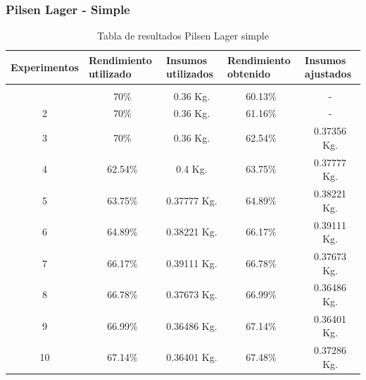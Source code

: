         \subsubsection{Pilsen Lager - Simple}
        
        \begin{longtable}{|p{2.7cm}|p{2.7cm}|p{2.7cm}|p{2.7cm}|p{2.7cm}|}
        \hline
        Experimentos & Rendimiento utilizado & Insumos utilizados & Rendimiento obtenido & Insumos ajustados\\
        \endfirsthead
        
        \endhead
 
        \endfoot
        
        \hline
        \caption{Tabla de resultados Pilsen Lager simple\label{tab:ResultadosPilsenSimple}}\\
        \endlastfoot
        \hline
             \multicolumn{1}{|c|}{1} & \multicolumn{1}{c|}{70\%} & \multicolumn{1}{c|}{0.36 Kg.} &\multicolumn{1}{c|}{60.13\%} &\multicolumn{1}{c|}{-} \\
             \hline
             \multicolumn{1}{|c|}{2} & \multicolumn{1}{c|}{70\%}  & \multicolumn{1}{c|}{0.36 Kg.} &\multicolumn{1}{c|}{61.16\%} &\multicolumn{1}{c|}{-} \\
             \hline
             \multicolumn{1}{|c|}{3} & \multicolumn{1}{c|}{70\%} & \multicolumn{1}{c|}{0.36 Kg.} &\multicolumn{1}{c|}{62.54\%} &\multicolumn{1}{c|}{0.37356 Kg.} \\
             \hline
             \multicolumn{1}{|c|}{4} & \multicolumn{1}{c|}{62.54\%}  & \multicolumn{1}{c|}{0.4 Kg.} &\multicolumn{1}{c|}{63.75\%} &\multicolumn{1}{c|}{0.37777 Kg.} \\
             \hline
             \multicolumn{1}{|c|}{5} & \multicolumn{1}{c|}{63.75\%}  & \multicolumn{1}{c|}{0.37777 Kg.} &\multicolumn{1}{c|}{64.89\%} &\multicolumn{1}{c|}{0.38221 Kg.} \\
             \hline
             \multicolumn{1}{|c|}{6} & \multicolumn{1}{c|}{64.89\%}  & \multicolumn{1}{c|}{0.38221 Kg.} &\multicolumn{1}{c|}{66.17\%} &\multicolumn{1}{c|}{0.39111 Kg.} \\
             \hline
             \multicolumn{1}{|c|}{7} & \multicolumn{1}{c|}{66.17\%}  & \multicolumn{1}{c|}{0.39111 Kg.} &\multicolumn{1}{c|}{66.78\%} &\multicolumn{1}{c|}{0.37673 Kg.} \\
             \hline
             \multicolumn{1}{|c|}{8} & \multicolumn{1}{c|}{66.78\%}  & \multicolumn{1}{c|}{0.37673 Kg.} &\multicolumn{1}{c|}{66.99\%} &\multicolumn{1}{c|}{0.36486 Kg.} \\
             \hline
             \multicolumn{1}{|c|}{9} & \multicolumn{1}{c|}{66.99\%}  & \multicolumn{1}{c|}{0.36486 Kg.} &\multicolumn{1}{c|}{67.14\%} &\multicolumn{1}{c|}{0.36401 Kg.} \\
             \hline
             \multicolumn{1}{|c|}{10} & \multicolumn{1}{c|}{67.14\%} & \multicolumn{1}{c|}{0.36401 Kg.} &\multicolumn{1}{c|}{67.48\%} &\multicolumn{1}{c|}{0.37286 Kg.} \\
             \hline
        
        \end{longtable}
        
